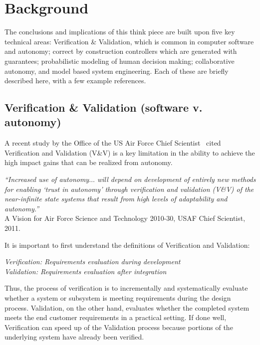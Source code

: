 
\section*{Background}

The conclusions and implications of this think piece are built upon five key technical areas: Verification \& Validation, which is common in computer software and autonomy; correct by construction controllers which are generated with guarantees; probabilistic modeling of human decision making; collaborative autonomy, and model based system engineering. Each of these are briefly described here, with a few example references. 

\subsection*{Verification \& Validation (software v. autonomy)}

A recent study by the Office of the US Air Force Chief Scientist~\cite{tech-horizons2011} cited Verification and Validation (V\&V) is a key limitation in the ability to achieve the high impact gains that can be realized from autonomy. 
\begin{center}
\parbox[c]{6in}{
{\em ``Increased use of autonomy$\ldots$  will depend on development of entirely new methods for enabling `trust in autonomy' through verification and validation (V\&V) of the near-infinite state systems that result from high levels of adaptability and autonomy.''} \\
\hspace*{20pt} A Vision for Air Force Science and Technology 2010-30, USAF Chief Scientist, 2011.
}
\end{center}

It is important to first understand the definitions of Verification and Validation:
\begin{center}
\parbox[c]{6in}{
{\em Verification: Requirements evaluation {\em during} development} \\[0.1 in]
{\em Validation: Requirements evaluation {\em after} integration} %
}
\end{center}
Thus, the process of verification is to incrementally and systematically evaluate whether a system or subsystem is meeting requirements during the design process. Validation, on the other hand, evaluates whether the completed system meets the end customer requirements in a practical setting. If done well, Verification can speed up of the Validation process because portions of the underlying system have already been verified. 

